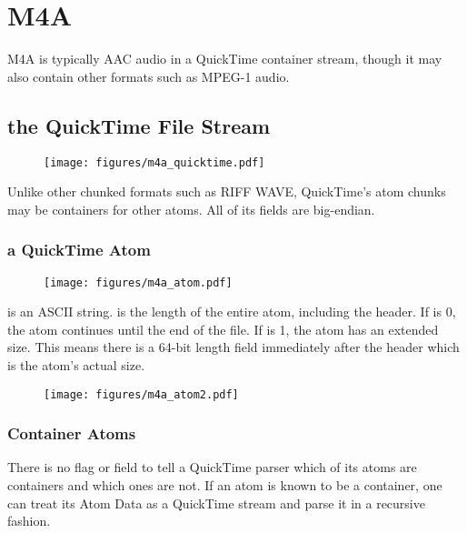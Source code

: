 
\chapter{M4A}
\label{m4a}
M4A is typically AAC audio in a QuickTime container stream, though
it may also contain other formats such as MPEG-1 audio.

\section{the QuickTime File Stream}
\begin{figure}[h]
\texttt{[image: figures/m4a\_quicktime.pdf]}
\end{figure}
\par
\noindent
Unlike other chunked formats such as RIFF WAVE, QuickTime's atom chunks
may be containers for other atoms.  All of its fields are big-endian.
\subsection{a QuickTime Atom}
\begin{figure}[h]
\texttt{[image: figures/m4a\_atom.pdf]}
\end{figure}
 is an ASCII string.
 is the length of the entire atom, including the header.
If  is 0, the atom continues until the end of the file.
If  is 1, the atom has an extended size.  This means
there is a 64-bit length field immediately after the header which is
the atom's actual size.
\begin{figure}[h]
\texttt{[image: figures/m4a\_atom2.pdf]}
\end{figure}
\subsection{Container Atoms}
There is no flag or field to tell a QuickTime parser which
of its atoms are containers and which ones are not.
If an atom is known to be a container, one can treat its Atom Data
as a QuickTime stream and parse it in a recursive fashion.
